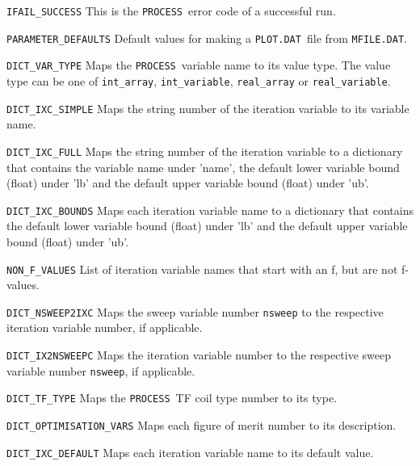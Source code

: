 \documentclass[11pt,a4paper]{report}
\newcommand{\mfile}{\mbox{\texttt{MFILE.DAT}}}
\newcommand{\plotdat}{\mbox{\texttt{PLOT.DAT}}}
\newcommand{\process}{\mbox{\texttt{PROCESS}}}
\begin{document}
\begin{description}

\item{\verb|IFAIL_SUCCESS|} This is the \process\ error code of a successful
  run.

\item{\verb|PARAMETER_DEFAULTS|} Default values for making a \plotdat\ file
  from \mfile.

\item{\verb|DICT_VAR_TYPE|} Maps the \process\ variable name to its value
  type. The value type can be one of \verb|int_array|, \verb|int_variable|,
  \verb|real_array| or \verb|real_variable|.

\item{\verb|DICT_IXC_SIMPLE|} Maps the string number of the iteration variable
  to its variable name.

\item{\verb|DICT_IXC_FULL|} Maps the string number of the iteration variable
  to a dictionary that contains the variable name under 'name', the default
  lower variable bound (float) under 'lb' and the default upper variable bound
  (float) under 'ub'.

\item{\verb|DICT_IXC_BOUNDS|} Maps each iteration variable name to a
  dictionary that contains the default lower variable bound (float) under 'lb'
  and the default upper variable bound (float) under 'ub'.

\item{\verb|NON_F_VALUES|} List of iteration variable names that start with an
  f, but are not f-values.

\item{\verb|DICT_NSWEEP2IXC|} Maps the sweep variable number \texttt{nsweep}
  to the respective iteration variable number, if applicable.

\item{\verb|DICT_IX2NSWEEPC|} Maps the iteration variable number to the
  respective sweep variable number \texttt{nsweep}, if applicable.

\item{\verb|DICT_TF_TYPE|} Maps the \process\ TF coil type number to its type.

\item{\verb|DICT_OPTIMISATION_VARS|} Maps each figure of merit number to its
  description.

\item{\verb|DICT_IXC_DEFAULT|} Maps each iteration variable name to its
  default value.

\end{description}
\end{document}
